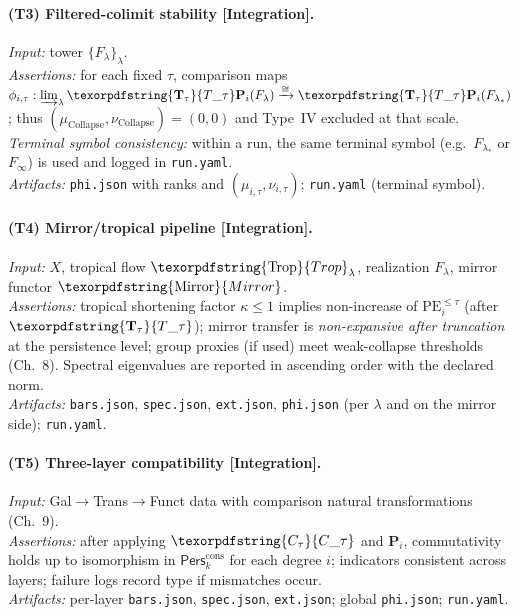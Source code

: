 \documentclass[11pt]{article}
\DeclareRobustCommand{\hyp}{\nobreakdash-}
\newcommand{\Pers}{\mathsf{Pers}}
\numberwithin{equation}{section}
\theoremstyle{definition}
\DeclareRobustCommand{\Perskft}{\Pers^{\mathrm{cons}}_{k}}
\DeclareRobustCommand{\Ttau}{\texorpdfstring{\ensuremath{\mathbf{T}_{\tau}}}{T\_\tau}}
\DeclareRobustCommand{\Ctau}{\texorpdfstring{\ensuremath{C_{\tau}}}{C\_\tau}}
\DeclareRobustCommand{\muc}{\mu_{\mathrm{Collapse}}}
\DeclareRobustCommand{\nuc}{\nu_{\mathrm{Collapse}}}
\DeclareRobustCommand{\Trop}{\texorpdfstring{\ensuremath{\operatorname{Trop}}}{Trop}}
\DeclareRobustCommand{\Mirror}{\texorpdfstring{\ensuremath{\operatorname{Mirror}}}{Mirror}}
\providecommand{\n}{\unskip\space}
\begin{document}
\paragraph{(T3) Filtered\hyp colimit stability [Integration].}
\emph{Input:} tower \(\{F_\lambda\}_\lambda\).\\\n\emph{Assertions:} for each fixed \(\tau\), comparison maps \(\phi_{i,\tau}:\varinjlim_\lambda \Ttau\mathbf{P}_i(F_\lambda)\xrightarrow{\cong}\Ttau\mathbf{P}_i(F_{\lambda_\ast})\); thus \((\muc,\nuc)=(0,0)\) and Type~IV excluded at that scale. \emph{Terminal symbol consistency:} within a run, the same terminal symbol (e.g.\ \(F_{\lambda_\ast}\) or \(F_\infty\)) is used and logged in \texttt{run.yaml}.\\\n\emph{Artifacts:} \texttt{phi.json} with ranks and \((\mu_{i,\tau},\nu_{i,\tau})\); \texttt{run.yaml} (terminal symbol).

\paragraph{(T4) Mirror/tropical pipeline [Integration].}
\emph{Input:} \(X\), tropical flow \(\Trop_\lambda\), realization \(F_\lambda\), mirror functor \(\Mirror\).\\\n\emph{Assertions:} tropical shortening factor \(\kappa\le 1\) implies non\hyp increase of \(\mathrm{PE}^{\le\tau}_i\) (after \(\Ttau\)); mirror transfer is \emph{non\hyp expansive after truncation} at the persistence level; group proxies (if used) meet weak\hyp collapse thresholds (Ch.~8). Spectral eigenvalues are reported in ascending order with the declared norm.\\\n\emph{Artifacts:} \texttt{bars.json}, \texttt{spec.json}, \texttt{ext.json}, \texttt{phi.json} (per \(\lambda\) and on the mirror side); \texttt{run.yaml}.

\paragraph{(T5) Three\hyp layer compatibility [Integration].}
\emph{Input:} Gal\(\to\)Trans\(\to\)Funct data with comparison natural transformations (Ch.~9).\\\n\emph{Assertions:} after applying \(\Ctau\) and \(\mathbf{P}_i\), commutativity holds up to isomorphism in \(\Perskft\) for each degree \(i\); indicators consistent across layers; failure logs record type if mismatches occur.\\\n\emph{Artifacts:} per\hyp layer \texttt{bars.json}, \texttt{spec.json}, \texttt{ext.json}; global \texttt{phi.json}; \texttt{run.yaml}.
\end{document}
